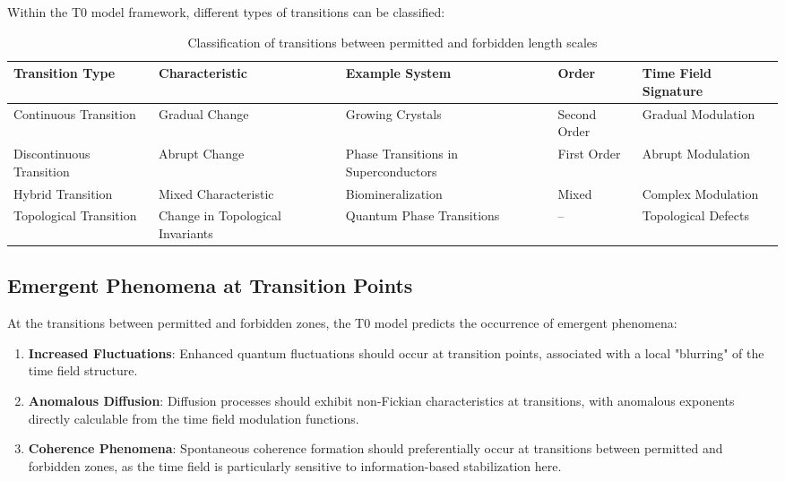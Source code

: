 \documentclass[12pt,a4paper]{article}
\begin{document}
	Within the T0 model framework, different types of transitions can be classified:
	
	\begin{table}[h]
		\centering
		\begin{adjustbox}{scale=0.6}
			\begin{tabular}{lllll}
				\hline
				\textbf{Transition Type} & \textbf{Characteristic} & \textbf{Example System} & \textbf{Order} & \textbf{Time Field Signature} \\
				\hline
				Continuous Transition & Gradual Change & Growing Crystals & Second Order & Gradual Modulation \\
				Discontinuous Transition & Abrupt Change & Phase Transitions in Superconductors & First Order & Abrupt Modulation \\
				Hybrid Transition & Mixed Characteristic & Biomineralization & Mixed & Complex Modulation \\
				Topological Transition & Change in Topological Invariants & Quantum Phase Transitions & – & Topological Defects \\
				\hline
			\end{tabular}
		\end{adjustbox}
		\caption{Classification of transitions between permitted and forbidden length scales}
		\label{tab:transitions}
	\end{table}
	
	\subsection{Emergent Phenomena at Transition Points}
	\label{subsec:emergente_phaenomene}
	
	At the transitions between permitted and forbidden zones, the T0 model predicts the occurrence of emergent phenomena:
	
	\begin{enumerate}
		\item \textbf{Increased Fluctuations}: Enhanced quantum fluctuations should occur at transition points, associated with a local "blurring" of the time field structure.
		
		\item \textbf{Anomalous Diffusion}: Diffusion processes should exhibit non-Fickian characteristics at transitions, with anomalous exponents directly calculable from the time field modulation functions.
		
		\item \textbf{Coherence Phenomena}: Spontaneous coherence formation should preferentially occur at transitions between permitted and forbidden zones, as the time field is particularly sensitive to information-based stabilization here.
	\end{enumerate}
	
\end{document}
